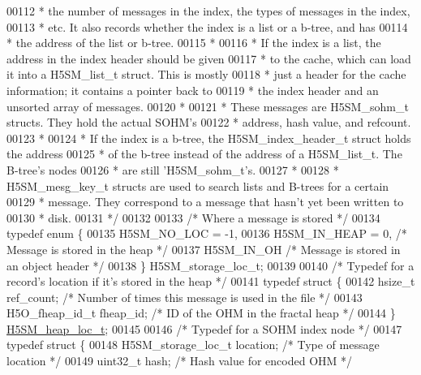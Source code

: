 \begin{DoxyCode}
00112 \textcolor{comment}{ * the number of messages in the index, the types of messages in the index,}
00113 \textcolor{comment}{ * etc.  It also records whether the index is a list or a b-tree, and has}
00114 \textcolor{comment}{ * the address of the list or b-tree.}
00115 \textcolor{comment}{ *}
00116 \textcolor{comment}{ * If the index is a list, the address in the index header should be given}
00117 \textcolor{comment}{ * to the cache, which can load it into a H5SM\_list\_t struct.  This is mostly}
00118 \textcolor{comment}{ * just a header for the cache information; it contains a pointer back to}
00119 \textcolor{comment}{ * the index header and an unsorted array of messages.}
00120 \textcolor{comment}{ *}
00121 \textcolor{comment}{ * These messages are H5SM\_sohm\_t structs.  They hold the actual SOHM's}
00122 \textcolor{comment}{ * address, hash value, and refcount.}
00123 \textcolor{comment}{ *}
00124 \textcolor{comment}{ * If the index is a b-tree, the H5SM\_index\_header\_t struct holds the address}
00125 \textcolor{comment}{ * of the b-tree instead of the address of a H5SM\_list\_t.  The B-tree's nodes}
00126 \textcolor{comment}{ * are still 'H5SM\_sohm\_t's.}
00127 \textcolor{comment}{ *}
00128 \textcolor{comment}{ * H5SM\_mesg\_key\_t structs are used to search lists and B-trees for a certain}
00129 \textcolor{comment}{ * message.  They correspond to a message that hasn't yet been written to}
00130 \textcolor{comment}{ * disk.}
00131 \textcolor{comment}{ */}
00132 
00133 \textcolor{comment}{/* Where a message is stored */}
00134 \textcolor{keyword}{typedef} \textcolor{keyword}{enum} \{
00135     H5SM\_NO\_LOC = -1,
00136     H5SM\_IN\_HEAP = 0,       \textcolor{comment}{/* Message is stored in the heap */}
00137     H5SM\_IN\_OH          \textcolor{comment}{/* Message is stored in an object header */}
00138 \} H5SM\_storage\_loc\_t;
00139 
00140 \textcolor{comment}{/* Typedef for a record's location if it's stored in the heap */}
00141 \textcolor{keyword}{typedef} \textcolor{keyword}{struct }\{
00142     hsize\_t ref\_count;      \textcolor{comment}{/* Number of times this message is used in the file */}
00143     H5O\_fheap\_id\_t fheap\_id;    \textcolor{comment}{/* ID of the OHM in the fractal heap */}
00144 \} \hyperlink{struct_h5_s_m__heap__loc__t}{H5SM\_heap\_loc\_t};
00145 
00146 \textcolor{comment}{/* Typedef for a SOHM index node */}
00147 \textcolor{keyword}{typedef} \textcolor{keyword}{struct }\{
00148     H5SM\_storage\_loc\_t location;        \textcolor{comment}{/* Type of message location */}
00149     uint32\_t hash;              \textcolor{comment}{/* Hash value for encoded OHM */}

\end{DoxyCode}
